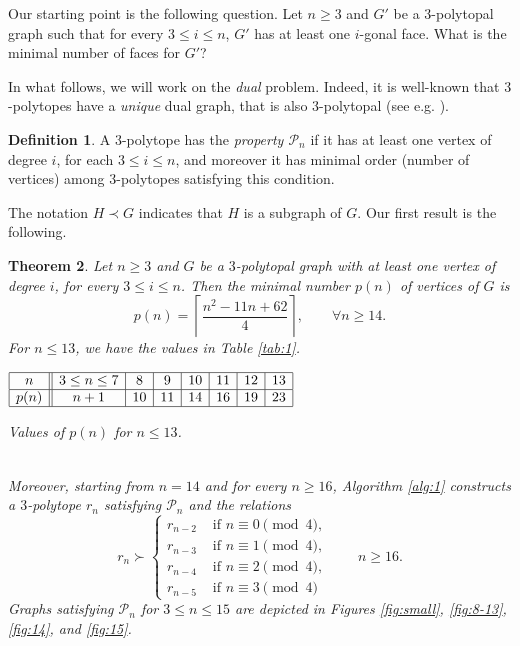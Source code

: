 \documentclass[11pt]{article}
\newcounter{countp}
\newtheorem{thm}{Theorem}%
\theoremstyle{definition}
\newtheorem{defin}[thm]{Definition}
\numberwithin{equation}{section}
\def\calP{\mathcal{P}}
\begin{document}
Our starting point is the following question. Let $n\geq 3$ and $G'$ be a $3$-polytopal graph such that for every $3\leq i\leq n$, $G'$ has at least one $i$-gonal face. What is the minimal number of faces for $G'$?

In what follows, we will work on the \textit{dual} problem. Indeed, it is well-known that $3$-polytopes have a \textit{unique} dual graph, that is also $3$-polytopal (see e.g. \cite[Chapter 11]{harary}).

\begin{defin}
	\label{def:1}
A $3$-polytope has the \textit{property $\calP_n$} if it has at least one vertex of degree $i$, for each $3\leq i\leq n$, and moreover it has minimal order (number of vertices) among $3$-polytopes satisfying this condition.
\end{defin}

The notation $H\prec G$ indicates that $H$ is a subgraph of $G$. Our first result is the following.
\setcounter{countp}{\thethm}
\begin{thm}
\label{thm:1}
Let $n\geq 3$ and $G$ be a $3$-polytopal graph with at least one vertex of degree $i$, for every $3\leq i\leq n$. Then the minimal number $p(n)$ of vertices of $G$ is
\begin{equation}
\label{eqn:p}
p(n)=\left\lceil\frac{n^2-11n+62}{4}\right\rceil, \qquad\forall n\geq 14.
\end{equation}
For $n\leq 13$, we have the values in Table \ref{tab:1}.
\begin{table}[h!]
	\centering
	$\begin{array}{|c||c|c|c|c|c|c|c|}
	\hline
	n&3\leq n\leq 7
	&8&9&10&11&12&13\\\hline
	p(n)&n+1
	&10&11&14&16&19&23\\\hline
	\end{array}$
	\caption{Values of $p(n)$ for $n\leq 13$.}
	\label{tab:1}
\end{table}
\\
Moreover, starting from $n=14$ and for every $n\geq 16$, Algorithm \ref{alg:1} constructs a $3$-polytope $r_n$ satisfying $\calP_n$ and the relations
\begin{equation}
\label{eqn:sub}
r_n\succ
\begin{cases}
r_{n-2} & \text{ if } n\equiv 0 \pmod 4,
\\r_{n-3} & \text{ if } n\equiv 1 \pmod 4,
\\r_{n-4} & \text{ if } n\equiv 2 \pmod 4,
\\r_{n-5} & \text{ if } n\equiv 3 \pmod 4
\end{cases}
\qquad n\geq 16.
\end{equation}
Graphs satisfying $\calP_n$ for $3\leq n\leq 15$ are depicted in Figures \ref{fig:small}, \ref{fig:8-13}, \ref{fig:14}, and \ref{fig:15}.
\end{thm}
\end{document}
